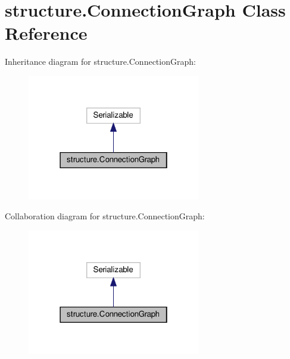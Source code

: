\hypertarget{classstructure_1_1_connection_graph}{}\section{structure.\+Connection\+Graph Class Reference}
\label{classstructure_1_1_connection_graph}


Inheritance diagram for structure.\+Connection\+Graph\+:
\nopagebreak
\begin{figure}[H]
\begin{center}
\leavevmode
\includegraphics[width=214pt]{classstructure_1_1_connection_graph__inherit__graph}
\end{center}
\end{figure}


Collaboration diagram for structure.\+Connection\+Graph\+:
\nopagebreak
\begin{figure}[H]
\begin{center}
\leavevmode
\includegraphics[width=214pt]{classstructure_1_1_connection_graph__coll__graph}
\end{center}
\end{figure}
